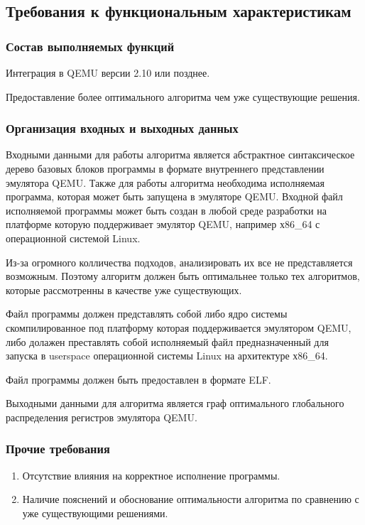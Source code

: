 

\subsection{Требования к функциональным характеристикам}
\subsubsection{Состав выполняемых функций}
\begin{my_enumerate}
\item Интеграция в QEMU версии 2.10 или позднее.
\item Предоставление более оптимального алгоритма чем уже существующие решения.
\end{my_enumerate}

\subsubsection{Организация входных и выходных данных}
Входными данными для работы алгоритма является абстрактное синтаксическое дерево базовых блоков программы
в формате внутреннего представлении эмулятора QEMU. Также для работы алгоритма необходима исполняемая программа, которая может быть запущена в эмуляторе QEMU. Входной файл исполняемой программы может быть создан в любой среде разработки на платформе которую поддерживает эмулятор QEMU, например х86\_64 с операционной системой Linux.

\begin{my_enumerate}
\item Из-за огромного колличества подходов, анализировать их все не представляется возможным. Поэтому алгоритм должен быть оптимальнее только тех алгоритмов, которые рассмотренны в качестве уже существующих.
\item Файл программы должен представлять собой либо ядро системы скомпилированное под платформу которая поддерживается эмулятором QEMU, либо долажен преставлять собой исполняемый файл предназначенный для запуска в userspace операционной системы Linux на архитектуре х86\_64.
\item Файл программы должен быть предоставлен в формате ELF.
\end{my_enumerate}

\medskip
Выходными данными для алгоритма является граф оптимального глобального распределения регистров эмулятора QEMU.

\subsubsection{Прочие требования}
\begin{enumerate}
\item Отсутствие влияния на корректное исполнение программы.
\item Наличие пояснений и обоснование оптимальности алгоритма по сравнению с уже существующими решениями.
\end{enumerate}


